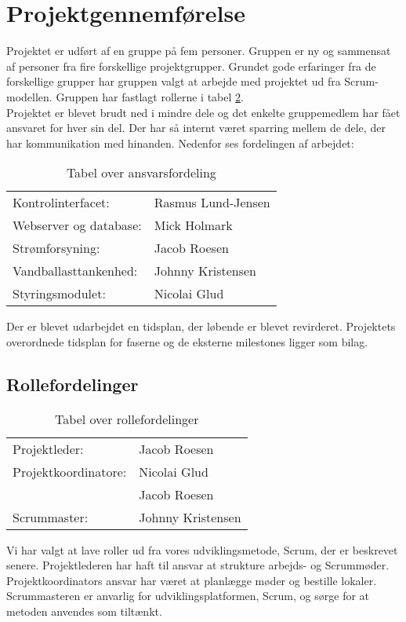 \section{Projektgennemførelse}
Projektet er udført af en gruppe på fem personer. Gruppen er ny og sammensat af personer fra fire forskellige projektgrupper. Grundet gode erfaringer fra de forskellige grupper har gruppen valgt at arbejde med projektet ud fra Scrum-modellen. Gruppen har fastlagt rollerne i tabel \ref{table:roller}. \\
Projektet er blevet brudt ned i mindre dele og det enkelte gruppemedlem har fået ansvaret for hver sin del. Der har så internt været sparring mellem de dele, der har kommunikation med hinanden. Nedenfor ses fordelingen af arbejdet:
\begin{table}[H]
\centering
\begin{tabular}{ll}
Kontrolinterfacet:			&Rasmus Lund-Jensen\\
Webserver og database: 		&Mick Holmark\\
Strømforsyning:				&Jacob Roesen\\
Vandballasttankenhed:		&Johnny Kristensen\\
Styringsmodulet:			&Nicolai Glud\\
\end{tabular}
\caption{Tabel over ansvarsfordeling}
\label{table:ansvar}
\end{table}
Der er blevet udarbejdet en tidsplan, der løbende er blevet revirderet. Projektets overordnede tidsplan for faserne og de eksterne milestones ligger som bilag.\\
\subsection{Rollefordelinger}
\begin{table}[H]
\centering
\begin{tabular}{ll}
Projektleder: 			&Jacob Roesen\\
Projektkoordinatore: 	&Nicolai Glud\\
						&Jacob Roesen\\
Scrummaster: 			&Johnny Kristensen\\
\end{tabular}
\caption{Tabel over rollefordelinger}
\label{table:roller}
\end{table}
Vi har valgt at lave roller ud fra vores udviklingsmetode, Scrum, der er beskrevet senere. Projektlederen har haft til ansvar at strukture arbejds- og Scrummøder. Projektkoordinators ansvar har været at planlægge møder og bestille lokaler. Scrummasteren er anvarlig for udviklingsplatformen, Scrum, og sørge for at metoden anvendes som tiltænkt. 